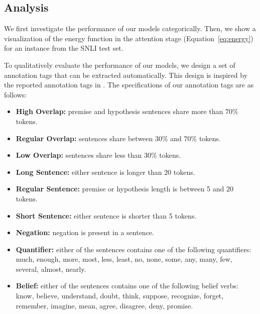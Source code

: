 \documentclass[11pt,a4paper]{article}
\begin{document}
	\subsection{Analysis} \label{sec:err}
	We first investigate the performance of our models categorically. Then, we show a visualization of the energy function in the attention stage (Equation~\ref{eq:energy}) for an instance from the SNLI test set. 
	
	To qualitatively evaluate the performance of our models, we design a set of annotation tags that can be extracted automatically. This design is inspired by the reported annotation tags in \citet{multinli}. The specifications of our annotation tags are as follows:
	
	
		\begin{itemize}
		\item \textbf{High Overlap:} premise and hypothesis sentences share more than $70\%$ tokens.
		\item \textbf{Regular Overlap:} sentences share between $30\%$ and $70\%$ tokens.
		\item \textbf{Low Overlap:} sentences share less than $30\%$ tokens.
		\item \textbf{Long Sentence:} either sentence is longer than 20 tokens.
		\item \textbf{Regular Sentence:} premise or hypothesis length is between 5 and 20 tokens.
		\item \textbf{Short Sentence:} either sentence is shorter than 5 tokens.
		\item \textbf{Negation:} negation is present in a sentence.
		\item \textbf{Quantifier:} either of the sentences contains one of the following quantifiers: much, enough, more, most, less, least, no, none, some, any, many, few, several, almost, nearly.
		\item \textbf{Belief:} either of the sentences contains one of the following belief verbs: know, believe, understand, doubt, think, suppose, recognize, forget, remember, imagine, mean, agree, disagree, deny, promise.
	\end{itemize}
	
\end{document}
